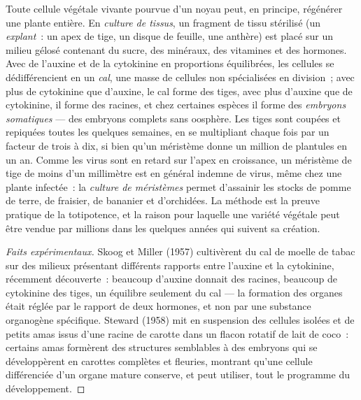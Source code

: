 \begin{proposition}\label{prop:b2:asexual-reproduction:tissueculture}
Toute cellule végétale vivante pourvue d'un noyau peut, en principe,
régénérer une plante entière. En \emph{culture de tissus}, un fragment
de tissu stérilisé (un \emph{explant}~: un apex de tige, un disque de
feuille, une anthère) est placé sur un milieu gélosé contenant du sucre,
des minéraux, des vitamines et des hormones. Avec de l'auxine et de la
cytokinine en proportions équilibrées, les cellules se dédifférencient
en un \emph{cal}, une masse de cellules non spécialisées en division~;
avec plus de cytokinine que d'auxine, le cal forme des tiges, avec plus
d'auxine que de cytokinine, il forme des racines, et chez certaines
espèces il forme des \emph{embryons somatiques} --- des embryons
complets sans oosphère. Les tiges sont coupées et repiquées toutes les
quelques semaines, en se multipliant chaque fois par un facteur de trois
à dix, si bien qu'un méristème donne un million de plantules en un an.
Comme les virus sont en retard sur l'apex en croissance, un méristème
de tige de moins d'un millimètre est en général indemne de virus, même
chez une plante infectée~: la \emph{culture de méristèmes} permet
d'assainir les stocks de pomme de terre, de fraisier, de bananier et
d'orchidées. La méthode est la preuve pratique de la totipotence, et la
raison pour laquelle une variété végétale peut être vendue par millions
dans les quelques années qui suivent sa création.
\end{proposition}
\begin{proof}[Faits expérimentaux]
Skoog et Miller (1957) cultivèrent du cal de moelle de tabac sur des
milieux présentant différents rapports entre l'auxine et la cytokinine,
récemment découverte~: beaucoup d'auxine donnait des racines, beaucoup de
cytokinine des tiges, un équilibre seulement du cal --- la formation des
organes était réglée par le rapport de deux hormones, et non par une
substance organogène spécifique. Steward (1958) mit en suspension des
cellules isolées et de petits amas issus d'une racine de carotte dans un
flacon rotatif de lait de coco~: certains amas formèrent des structures
semblables à des embryons qui se développèrent en carottes complètes et
fleuries, montrant qu'une cellule différenciée d'un organe mature
conserve, et peut utiliser, tout le programme du développement.
\end{proof}

